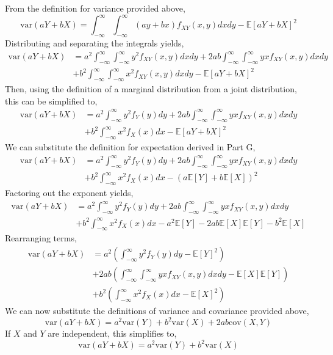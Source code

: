 \documentclass[12pt,twoside]{article}
\begin{document}
\begin{problems}
\begin{problemparts}
From the definition for variance provided above,
$$ \mathrm{var}(a Y + b X) = \int_{-\infty}^{\infty} \int_{-\infty}^{\infty} (a y
+ b x) f_{XY}(x, y) dx dy - \mathbb{E}[aY + bX]^2 $$
Distributing and separating the integrals yields,
\begin{align*}
    \mathrm{var}(aY + bX) &= a^2 \int_{-\infty}^{\infty} \int_{-\infty}^{\infty} 
    y^2 f_{XY}(x, y) dx dy + 2ab \int_{-\infty}^{\infty}\int_{-\infty}^{\infty} yx
    f_{XY}(x, y) dx dy \\
    &+ b^2 \int_{-\infty}^{\infty}\int_{-\infty}^{\infty} x^2 f_{XY}(x, y) dx dy -
    \mathbb{E}[aY + bX]^2
\end{align*}
Then, using the definition of a marginal distribution from a joint distribution,
this can be simplified to,
\begin{align*}
    \mathrm{var}(aY + bX) &= a^2 \int_{-\infty}^{\infty} y^2 f_{Y}(y) dy + 2ab
    \int_{-\infty}^{\infty}\int_{-\infty}^{\infty} yx f_{XY}(x, y) dx dy \\
    &+ b^2 \int_{-\infty}^{\infty} x^2 f_{X}(x) dx - \mathbb{E}[aY + bX]^2
\end{align*}
We can substitute the definition for expectation derived in Part G,
\begin{align*}
    \mathrm{var}(aY + bX) &= a^2 \int_{-\infty}^{\infty} y^2 f_{Y}(y) dy + 2ab
    \int_{-\infty}^{\infty}\int_{-\infty}^{\infty} yx f_{XY}(x, y) dx dy \\
    &+ b^2 \int_{-\infty}^{\infty} x^2 f_{X}(x) dx - \left(a \mathbb{E}[Y] + b 
    \mathbb{E}[X]\right)^2
\end{align*}
Factoring out the exponent yields,
\begin{align*}
    \mathrm{var}(aY + bX) &= a^2 \int_{-\infty}^{\infty} y^2 f_{Y}(y) dy + 2ab
    \int_{-\infty}^{\infty}\int_{-\infty}^{\infty} yx f_{XY}(x, y) dx dy \\
    &+ b^2 \int_{-\infty}^{\infty} x^2 f_{X}(x) dx - a^2 \mathbb{E}[Y] - 2ab
    \mathbb{E}[X] \mathbb{E}[Y] - b^2 \mathbb{E}[X]
\end{align*}
Rearranging terms,
\begin{align*}
    \mathrm{var}(aY + bX) &= a^2 \left(\int_{-\infty}^{\infty} y^2 f_{Y}(y) dy - 
    \mathbb{E}[Y]^2\right) \\
    &+  2ab \left(\int_{-\infty}^{\infty}\int_{-\infty}^{\infty} yx f_{XY}(x, y) 
    dx dy - \mathbb{E}[X] \mathbb{E}[Y]\right) \\
    &+ b^2 \left(\int_{-\infty}^{\infty} x^2 f_{X}(x) dx - \mathbb{E}[X]^2\right)
\end{align*}
We can now substitute the definitions of variance and covariance provided above,
$$ \mathrm{var}(aY + bX) = a^2 \mathrm{var}(Y) + b^2 \mathrm{var}(X) + 2ab
\mathrm{cov}(X, Y) $$
If $X$ and $Y$ are independent, this simplifies to,
$$ \mathrm{var}(aY + bX) = a^2 \mathrm{var}(Y) + b^2 \mathrm{var}(X) $$


\end{problemparts}
\end{problems}
\end{document}
